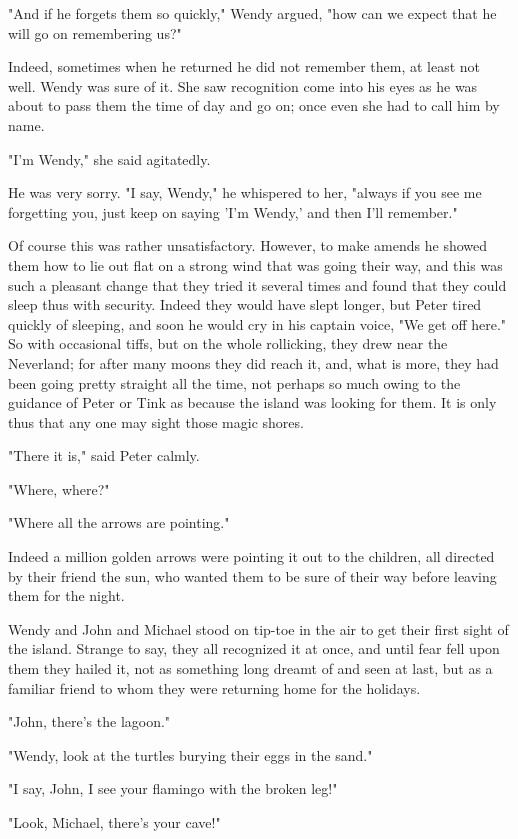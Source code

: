 "And if he forgets them so quickly," Wendy argued,
"how can we expect that he will go on remembering us?"

Indeed, sometimes when he returned he did not remember them, at least not well.
Wendy was sure of it.
She saw recognition come into his eyes as he was about to pass them the time of day and go on;
once even she had to call him by name.

"I'm Wendy," she said agitatedly.

He was very sorry.
"I say, Wendy," he whispered to her,
"always if you see me forgetting you,
just keep on saying 'I'm Wendy,' and then I'll remember."

Of course this was rather unsatisfactory.
However, to make amends he showed them how to lie out flat on a strong wind that was going their way,
and this was such a pleasant change that they tried it several times
and found that they could sleep thus with security.
Indeed they would have slept longer, but Peter tired quickly of sleeping,
and soon he would cry in his captain voice, "We get off here."
So with occasional tiffs, but on the whole rollicking, they drew near the Neverland;
for after many moons they did reach it, and, what is more,
they had been going pretty straight all the time,
not perhaps so much owing to the guidance of Peter or Tink as because the island was looking for them.
It is only thus that any one may sight those magic shores.

"There it is," said Peter calmly.

"Where, where?"

"Where all the arrows are pointing."

Indeed a million golden arrows were pointing it out to the children,
all directed by their friend the sun,
who wanted them to be sure of their way before leaving them for the night.

Wendy and John and Michael stood on tip-toe in the air to get their first sight of the island.
Strange to say, they all recognized it at once,
and until fear fell upon them they hailed it,
not as something long dreamt of and seen at last,
but as a familiar friend to whom they were returning home for the holidays.

"John, there's the lagoon."

"Wendy, look at the turtles burying their eggs in the sand."

"I say, John, I see your flamingo with the broken leg!"

"Look, Michael, there's your cave!"

